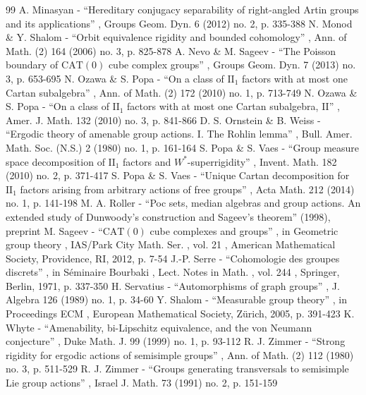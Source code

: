 \documentclass[11pt]{article}
\numberwithin{equation}{section}
\theoremstyle{plain}
\theoremstyle{definition}
\begin{document}
\begin{thebibliography}{99}
 A. Minasyan - “Hereditary conjugacy separability of right-angled Artin groups and its applications” , Groups Geom. Dyn. 6 (2012) no. 2, p. 335-388
 N. Monod \& Y. Shalom - “Orbit equivalence rigidity and bounded cohomology” , Ann. of Math. (2) 164 (2006) no. 3, p. 825-878
 A. Nevo \& M. Sageev - “The Poisson boundary of $\mathrm{CAT}(0)$ cube complex groups” , Groups Geom. Dyn. 7 (2013) no. 3, p. 653-695
 N. Ozawa \& S. Popa - “On a class of $\mathrm{II}_1$ factors with at most one Cartan subalgebra” , Ann. of Math. (2) 172 (2010) no. 1, p. 713-749
 N. Ozawa \& S. Popa - “On a class of $\mathrm{II}_1$ factors with at most one Cartan subalgebra, II” , Amer. J. Math. 132 (2010) no. 3, p. 841-866
 D. S. Ornstein \& B. Weiss - “Ergodic theory of amenable group actions. I. The Rohlin lemma” , Bull. Amer. Math. Soc. (N.S.) 2 (1980) no. 1, p. 161-164
 S. Popa \& S. Vaes - “Group measure space decomposition of $\mathrm{II}_1$ factors and ${W}^*$-superrigidity” , Invent. Math. 182 (2010) no. 2, p. 371-417
 S. Popa \& S. Vaes - “Unique Cartan decomposition for $\mathrm{II}_1$ factors arising from arbitrary actions of free groups” , Acta Math. 212 (2014) no. 1, p. 141-198
 M. A. Roller - “Poc sets, median algebras and group actions. An extended study of Dunwoody’s construction and Sageev’s theorem” (1998), preprint
 M. Sageev - “$\mathrm{CAT}(0)$ cube complexes and groups” , in Geometric group theory , IAS/Park City Math. Ser. , vol. 21 , American Mathematical Society, Providence, RI, 2012, p. 7-54
 J.-P. Serre - “Cohomologie des groupes discrets” , in Séminaire Bourbaki , Lect. Notes in Math. , vol. 244 , Springer, Berlin, 1971, p. 337-350
 H. Servatius - “Automorphisms of graph groups” , J. Algebra 126 (1989) no. 1, p. 34-60
 Y. Shalom - “Measurable group theory” , in Proceedings ECM , European Mathematical Society, Zürich, 2005, p. 391-423
 K. Whyte - “Amenability, bi-Lipschitz equivalence, and the von Neumann conjecture” , Duke Math. J. 99 (1999) no. 1, p. 93-112
 R. J. Zimmer - “Strong rigidity for ergodic actions of semisimple groups” , Ann. of Math. (2) 112 (1980) no. 3, p. 511-529
 R. J. Zimmer - “Groups generating transversals to semisimple Lie group actions” , Israel J. Math. 73 (1991) no. 2, p. 151-159
\end{thebibliography}
\end{document}

